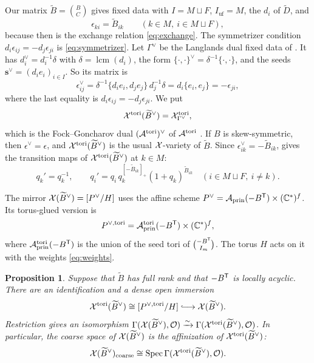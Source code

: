 \documentclass[12pt, letter]{amsart}
\newtheorem{proposition}[dummy]{Proposition}
\theoremstyle{definition}
\begin{document}
Our matrix $\widetilde B=\binom BC$ gives fixed data with $I=M\sqcup F$, $I_{\mathrm{uf}}=M$, the $d_i$ of $\widetilde D$, and
\[
 \epsilon_{ki}=\widetilde B_{ik}\qquad(k\in M,\ i\in M\sqcup F),
\]
because then \cite[(2.8)]{GHK} is the exchange relation \eqref{eq:exchange}.
The symmetrizer condition $d_i\epsilon_{ij}=-d_j\epsilon_{ji}$ is \eqref{eq:symmetrizer}.
Let $\Gamma^\vee$ be the Langlands dual fixed data of \cite[Appendix~A]{GHKK}.
It has $d_i^\vee=d_i^{-1}\delta$ with $\delta=\operatorname{lcm}(d_i)$, the form $\{\cdot,\cdot\}^\vee=\delta^{-1}\{\cdot,\cdot\}$, and the seeds $\mathbf s^\vee=(d_ie_i)_{i\in I}$.
So its matrix is
\[
 \epsilon^\vee_{ij}=\delta^{-1}\{d_ie_i,d_je_j\}\,d_j^{-1}\delta=d_i\{e_i,e_j\}=-\epsilon_{ji},
\]
where the last equality is $d_i\epsilon_{ij}=-d_j\epsilon_{ji}$.
We put
\[
 \mathcal{X}^{\mathrm{tori}}(\widetilde B^\vee)=\mathcal{X}^{\mathrm{tori}}_{\Gamma^\vee},
\]
which is the Fock--Goncharov dual $(\mathcal{A}^{\mathrm{tori}})^\vee$ of $\mathcal{A}^{\mathrm{tori}}$ \cite[Definition~A.4]{GHKK}.
If $B$ is skew-symmetric, then $\epsilon^\vee=\epsilon$, and $\mathcal{X}^{\mathrm{tori}}(\widetilde B^\vee)$ is the usual $\mathcal{X}$-variety of $\widetilde B$.
Since $\epsilon^\vee_{ik}=-\widetilde B_{ik}$, \cite[(2.7)]{GHK} gives the transition maps of $\mathcal{X}^{\mathrm{tori}}(\widetilde B^\vee)$ at $k\in M$:
\begin{equation}\label{eq:cluster-x-mutation}
 q_k'=q_k^{-1},\qquad
 q_i'=q_i\,q_k^{[-\widetilde B_{ik}]_+}(1+q_k)^{\widetilde B_{ik}}
 \quad(i\in M\sqcup F,\ i\ne k).
\end{equation}

The mirror $\mathcal{X}(\widetilde B^\vee)=[P^\vee/H]$ uses the affine scheme $P^\vee=\mathcal{A}_{\mathrm{prin}}(-B^{\mathsf T})\times(\mathbb{C}^*)^f$.
Its torus-glued version is
\[
 P^{\vee,\mathrm{tori}}=\mathcal{A}^{\mathrm{tori}}_{\mathrm{prin}}(-B^{\mathsf T})\times(\mathbb{C}^*)^f,
\]
where $\mathcal{A}^{\mathrm{tori}}_{\mathrm{prin}}(-B^{\mathsf T})$ is the union of the seed tori of $\binom{-B^{\mathsf T}}{I_m}$.
The torus $H$ acts on it with the weights \eqref{eq:weights}.

\begin{proposition}\label{prop:cluster-x-mirror}
Suppose that $\widetilde B$ has full rank and that $-B^{\mathsf T}$ is locally acyclic.
There are an identification and a dense open immersion
\begin{equation}\label{eq:cluster-x-open}
 \cX^{\mathrm{tori}}(\widetilde B^\vee)\cong[P^{\vee,\mathrm{tori}}/H]\lhook\joinrel\longrightarrow\cX(\widetilde B^\vee).
\end{equation}
Restriction gives an isomorphism $\Gamma(\mathcal{X}(\widetilde B^\vee),\mathcal{O})\xrightarrow{\sim}\Gamma(\mathcal{X}^{\mathrm{tori}}(\widetilde B^\vee),\mathcal{O})$.
In particular, the coarse space of $\mathcal{X}(\widetilde B^\vee)$ is the affinization of $\mathcal{X}^{\mathrm{tori}}(\widetilde B^\vee)$:
\begin{equation}
\label{eq:cluster-x-affinization}
 \mathcal{X}(\widetilde B^\vee)_{\mathrm{coarse}}\cong\operatorname{Spec}\Gamma(\mathcal{X}^{\mathrm{tori}}(\widetilde B^\vee),\mathcal{O}).
\end{equation}
\end{proposition}
\end{document}
